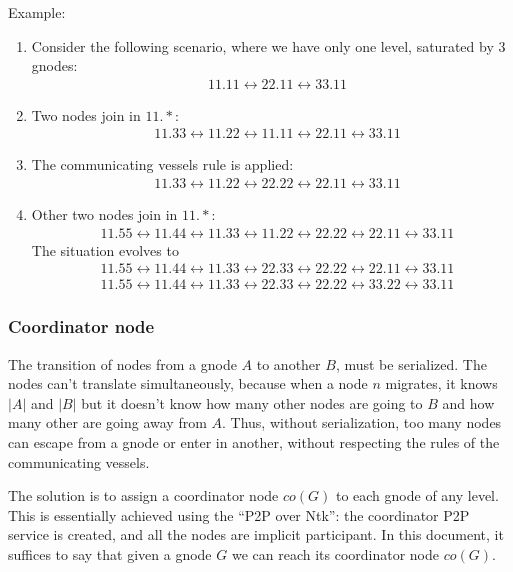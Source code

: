 \documentclass[a4paper]{article}
\newcommand{\eal}[1]{{\begin{align*} #1 \end{align*}}}
\begin{document}
Example:
\begin{enumerate}
	\item Consider the following scenario, where we have only one level,
		saturated by 3 gnodes:
\eal{ &11.11 \leftrightarrow 22.11 \leftrightarrow 33.11}
\item Two nodes join in $11.*$:
\eal{ &11.33\leftrightarrow 11.22\leftrightarrow 11.11 \leftrightarrow 22.11 \leftrightarrow 33.11}
\item The communicating vessels rule is applied:
\eal{ &11.33\leftrightarrow 11.22\leftrightarrow 22.22 \leftrightarrow 22.11 \leftrightarrow 33.11}
\item Other two nodes join in $11.*$:
\eal{ &11.55\leftrightarrow 11.44\leftrightarrow 11.33\leftrightarrow 11.22\leftrightarrow 22.22 \leftrightarrow 22.11 \leftrightarrow 33.11}
	The situation evolves to
\eal{
&11.55\leftrightarrow 11.44\leftrightarrow 11.33\leftrightarrow
22.33\leftrightarrow 22.22 \leftrightarrow 22.11 \leftrightarrow 33.11\\ 
&11.55\leftrightarrow 11.44\leftrightarrow 11.33\leftrightarrow
22.33\leftrightarrow 22.22 \leftrightarrow 33.22 \leftrightarrow 33.11
}
\end{enumerate}

\subsubsection{Coordinator node}
The transition of nodes from a gnode $A$ to another $B$, must be serialized.
The nodes can't translate simultaneously, because when a node $n$ migrates, it knows
$|A|$ and $|B|$ but it doesn't know how many other nodes are going to $B$ and
how many other are going away from $A$. Thus, without serialization, too many
nodes can escape from a gnode or enter in another, without respecting the
rules of the communicating vessels.

The solution is to assign a coordinator node $co(G)$ to each gnode of any
level. This is essentially achieved using the ``P2P over Ntk''\cite{ntkp2p}:
the coordinator P2P service is created, and all the nodes are implicit
participant. In this document, it suffices to say that given a gnode $G$ we
can reach its coordinator node $co(G)$.
\end{document}
